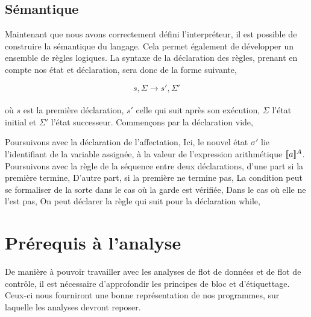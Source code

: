\documentclass[a4paper, 11pt]{article}
\begin{document}
\subsection{Sémantique}
Maintenant que nous avons correctement défini l'interpréteur, il est possible 
de construire la sémantique du langage. Cela permet également de développer 
un ensemble de règles logiques. La syntaxe de la déclaration des règles,
prenant en compte nos état et déclaration, sera donc de la forme suivante,

\[s, \Sigma \longrightarrow s', \Sigma'\]
\\
où $s$ est la première déclaration, $s'$ celle qui suit après son exécution, 
$\Sigma$ l'état initial et $\Sigma'$  l'état successeur. Commençons 
par la déclaration vide,

\srule{ }{\semanticd{\sskip}{\sigma}{\emptyset}{\sigma}}

Poursuivons avec la déclaration de l'affectation,
Ici, le nouvel état $\sigma'$ lie l'identifiant de la variable assignée, à la 
valeur de l'expression arithmétique $[\![{a}]\!]^{A}$. Poursuivons avec la règle 
de la séquence entre deux déclarations, d'une part si la première termine,
{}
D'autre part, si la première ne termine pas,
{}
La condition peut se formaliser de la sorte dans le cas où la garde est vérifiée,
{}
Dans le cas où elle ne l'est pas,
{}
On peut déclarer la règle qui suit pour la déclaration while,
{}

\section{Prérequis à l'analyse}
De manière à pouvoir travailler avec les analyses de flot de données et de flot de contrôle, 
il est nécessaire d'approfondir les principes de bloc et d'étiquettage. Ceux-ci nous fourniront
une bonne représentation de nos programmes, sur laquelle les analyses devront reposer.
\end{document}
